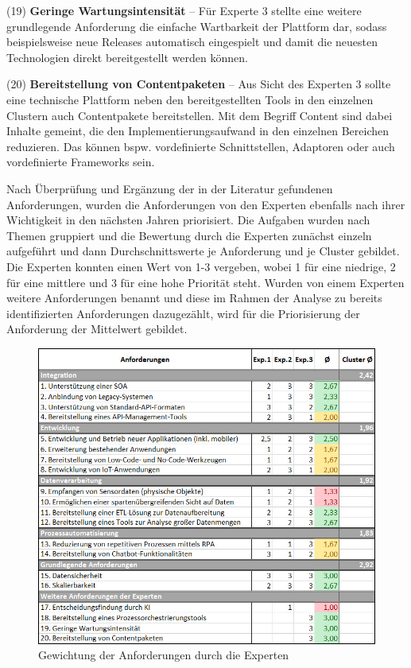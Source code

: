 (19) \textbf{Geringe Wartungsintensität} – Für Experte 3 stellte eine weitere grundlegende Anforderung die einfache Wartbarkeit der Plattform dar, sodass beispielsweise neue Releases automatisch eingespielt und damit die neuesten Technologien direkt bereitgestellt werden können. \autocite[Vgl.][]{SCHMIDT2023} 

(20) \textbf{Bereitstellung von Contentpaketen} – Aus Sicht des Experten 3 sollte eine technische Plattform neben den bereitgestellten Tools in den einzelnen Clustern auch Contentpakete bereitstellen. Mit dem Begriff Content sind dabei Inhalte gemeint, die den Implementierungsaufwand in den einzelnen Bereichen reduzieren. Das können bspw. vordefinierte Schnittstellen, Adaptoren oder auch vordefinierte Frameworks sein. \autocite[Vgl.][]{SCHMIDT2023} 

Nach Überprüfung und Ergänzung der in der Literatur gefundenen Anforderungen, wurden die Anforderungen von den Experten ebenfalls nach ihrer Wichtigkeit in den nächsten Jahren priorisiert. Die Aufgaben wurden nach Themen gruppiert und die Bewertung durch die Experten zunächst einzeln aufgeführt und dann Durchschnittswerte je Anforderung und je Cluster gebildet. Die Experten konnten einen Wert von 1-3 vergeben, wobei 1 für eine niedrige, 2 für eine mittlere und 3 für eine hohe Priorität steht. Wurden von einem Experten weitere Anforderungen benannt und diese im Rahmen der Analyse zu bereits identifizierten Anforderungen dazugezählt, wird für die Priorisierung der Anforderung der Mittelwert gebildet.

\begin{figure}[h]
    \centering
    \includegraphics[width=1\textwidth]{img/Gewichtung_Anforderung2.jpg}
    \caption[Gewichtung der Anforderungen durch die Experten]{Gewichtung der Anforderungen durch die Experten\autocite{Gewichtung}}
    \label{fig:Gewichtung}
\end{figure}

